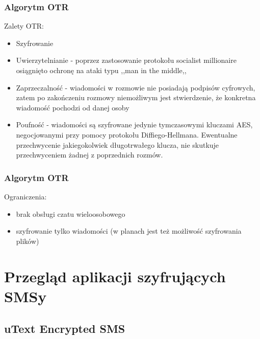 \documentclass[xcolor=table]{beamer}
\begin{document}
\begin{frame}
  \frametitle{Algorytm OTR}

Zalety OTR:
\begin{itemize}
\item Szyfrowanie
\item Uwierzytelnianie - poprzez zastosowanie protokołu socialist millionaire 
osiągnięto ochronę na ataki typu ,,man in the middle,,
\item Zaprzeczalność - wiadomości w rozmowie nie posiadają podpisów cyfrowych,
zatem po zakończeniu rozmowy niemożliwym jest stwierdzenie, że konkretna 
wiadomość pochodzi od danej osoby
\item Poufność - wiadomości są szyfrowane jedynie tymczasowymi kluczami AES, negocjowanymi przy pomocy protokołu Diffiego-Hellmana. Ewentualne przechwycenie jakiegokolwiek długotrwałego klucza, nie skutkuje przechwyceniem żadnej z poprzednich rozmów.
\end{itemize}
\end{frame}

\begin{frame}
  \frametitle{Algorytm OTR}
  
Ograniczenia:
\begin{itemize}
\item brak obsługi czatu wieloosobowego
\item szyfrowanie tylko wiadomości (w planach jest też możliwość szyfrowania plików)
\end{itemize}
\end{frame}

\section{Przegląd aplikacji szyfrujących SMSy}

\subsection{uText Encrypted SMS}
\end{document}
